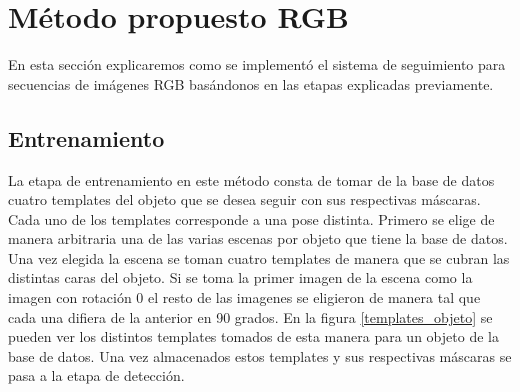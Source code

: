 \section{Método propuesto RGB}\label{metodo_rgb}
En esta sección explicaremos como se implementó el sistema de seguimiento para secuencias de imágenes RGB basándonos en las etapas explicadas previamente. 

\subsection{Entrenamiento}
La etapa de entrenamiento en este método consta de tomar de la base de datos cuatro templates del objeto que se desea seguir con sus respectivas máscaras. Cada uno de los templates corresponde a una pose distinta. Primero se elige de manera arbitraria una de las varias escenas por objeto que tiene la base de datos. Una vez elegida la escena se toman cuatro templates de manera que se cubran las distintas caras del objeto. Si se toma la primer imagen de la escena como la imagen con rotación 0 el resto de las imagenes se eligieron de manera tal que cada una difiera de la anterior en 90 grados. En la figura \ref{templates_objeto} se pueden ver los distintos templates tomados de esta manera para un objeto de la base de datos. Una vez almacenados estos templates y sus respectivas máscaras se pasa a la etapa de detección.

